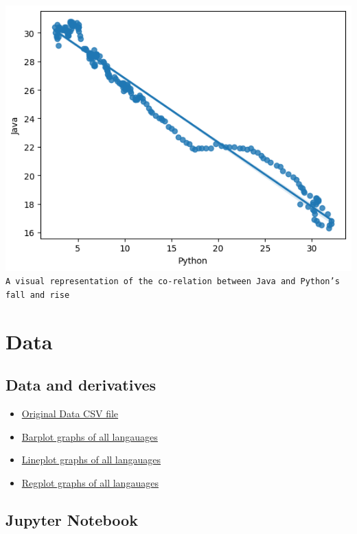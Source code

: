 \documentclass[conference]{IEEEtran}
\begin{document}
\includegraphics[scale=0.5]{regplot/java-v-python.png}\\
\texttt{A visual representation of the co-relation between Java and Python's fall and rise}

\section{Data}

\subsection{Data and derivatives}

\begin{itemize}
\item \href{https://github.com/0thorderlogic/smalldata/blob/main/data/backup.csv}{Original Data CSV file}
\item \href{https://github.com/0thorderlogic/smalldata/tree/main/barplot}{Barplot graphs of all langauages}
\item \href{https://github.com/0thorderlogic/smalldata/tree/main/lineplot}{Lineplot graphs of all langauages}
\item \href{https://github.com/0thorderlogic/smalldata/tree/main/regplot}{Regplot graphs of all langauages}
\end{itemize}

\subsection{Jupyter Notebook}
\end{document}
